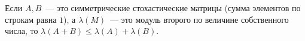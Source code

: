 Если $A, B$~--- это симметрические стохастические матрицы (сумма элементов по строкам равна $1$), а
$\lambda(M)$~--- это модуль второго по величине собственного числа, то
$\lambda(A + B) \le \lambda(A) + \lambda(B)$.
